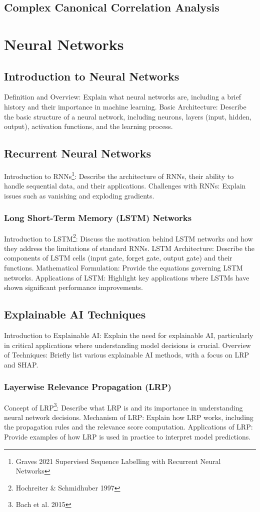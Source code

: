 \subsection{Complex Canonical Correlation Analysis}

\section{Neural Networks}
\subsection{Introduction to Neural Networks}
Definition and Overview: Explain what neural networks are, including a brief history and their importance in machine learning.
Basic Architecture: Describe the basic structure of a neural network, including neurons, layers (input, hidden, output), activation functions, and the learning process.
\subsection{Recurrent Neural Networks}
Introduction to RNNs\footnote{Graves 2021 Supervised Sequence Labelling with Recurrent Neural Networks}: Describe the architecture of RNNs, their ability to handle sequential data, and their applications.
Challenges with RNNs: Explain issues such as vanishing and exploding gradients.


\subsubsection{Long Short-Term Memory (LSTM) Networks}
Introduction to LSTM\footnote{Hochreiter \& Schmidhuber 1997}: Discuss the motivation behind LSTM networks and how they address the limitations of standard RNNs.
LSTM Architecture: Describe the components of LSTM cells (input gate, forget gate, output gate) and their functions.
Mathematical Formulation: Provide the equations governing LSTM networks.
Applications of LSTM: Highlight key applications where LSTMs have shown significant performance improvements.
\subsection{Explainable AI Techniques}
Introduction to Explainable AI: Explain the need for explainable AI, particularly in critical applications where understanding model decisions is crucial.
Overview of Techniques: Briefly list various explainable AI methods, with a focus on LRP and SHAP.
\subsubsection{Layerwise Relevance Propagation (LRP)}
Concept of LRP\footnote{Bach et al. 2015}: Describe what LRP is and its importance in understanding neural network decisions.
Mechanism of LRP: Explain how LRP works, including the propagation rules and the relevance score computation.
Applications of LRP: Provide examples of how LRP is used in practice to interpret model predictions.


